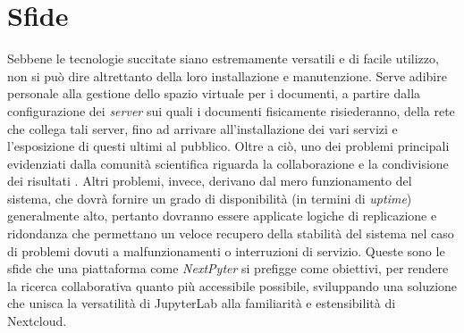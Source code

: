 \newpage
\section{Sfide}
Sebbene le tecnologie succitate siano estremamente versatili e di facile utilizzo, non si può dire altrettanto della loro installazione e manutenzione. Serve adibire personale alla gestione dello spazio virtuale per i documenti, a partire dalla configurazione dei \textit{server} sui quali i documenti fisicamente risiederanno, della rete che collega tali server, fino ad arrivare all'installazione dei vari servizi e l'esposizione di questi ultimi al pubblico.\newline
Oltre a ciò, uno dei problemi principali evidenziati dalla comunità scientifica riguarda la collaborazione e la condivisione dei risultati \cite{je2021reactive}.
\newline
Altri problemi, invece, derivano dal mero funzionamento del sistema, che dovrà fornire un grado di disponibilità (in termini di \textit{uptime}) generalmente alto, pertanto dovranno essere applicate logiche di replicazione e ridondanza che permettano un veloce recupero della stabilità del sistema nel caso di problemi dovuti a malfunzionamenti o interruzioni di servizio.
\newline
Queste sono le sfide che una piattaforma come \textit{NextPyter} si prefigge come obiettivi, per rendere la ricerca collaborativa quanto più accessibile possibile, sviluppando una soluzione che unisca la versatilità di JupyterLab alla familiarità e estensibilità di Nextcloud.